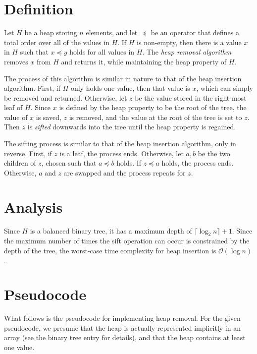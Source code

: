 \documentclass[12pt]{article}
\begin{document}

\section*{Definition}

Let $H$ be a heap storing $n$ elements, and let $\preceq$ be an operator that defines a total order over all of the values in $H$.
If $H$ is non-empty, then there is a value $x$ in $H$ such that $x\preceq y$ holds for all values in $H$.
The \emph{heap removal algorithm} removes $x$ from $H$ and returns it,
while maintaining the heap property of $H$.

The process of this algorithm is similar in nature to that of the heap insertion algorithm.  First, if $H$ only holds one value, then that value is $x$, which can simply be removed and returned.
Otherwise, let $z$ be the value stored in the right-most leaf of $H$.
Since $x$ is defined by the heap property to be the root of the tree,
the value of $x$ is saved, $z$ is removed, and the value at the root of the tree is set to $z$.  Then $z$ is \emph{sifted} downwards into the tree until the heap property is regained.

The sifting process is similar to that of the heap insertion algorithm, only in reverse.  First, if $z$ is a leaf, the process ends.  Otherwise, let $a, b$ be the two children of $z$, chosen such that $a \preceq b$ holds.  If $z \preceq a$ holds, the process ends.  Otherwise, $a$ and $z$ are swapped and the process repeats for $z$.

\section*{Analysis}

Since $H$ is a balanced binary tree, it has a maximum depth of $\lceil\log_2n\rceil+1$.  Since the maximum number of times the sift operation can occur is constrained by the depth of the tree, the worst-case time complexity for heap insertion is $\mathcal{O}(\log n)$.

\clearpage
\section*{Pseudocode}

What follows is the pseudocode for implementing heap removal.  For the given
pseudocode, we presume that the heap is actually represented implicitly in
an array (see the binary tree entry for details), and that the heap contains at least one value.
\end{document}
